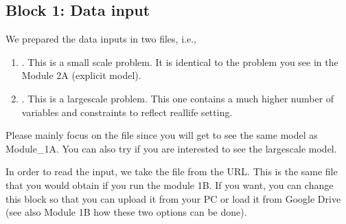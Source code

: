 \documentclass[letterpaper,10pt,english]{jupyterBook}
\begin{document}
\subsection{Block 1: Data input}
\label{\detokenize{docs/Case1_5_Module2B_Retail_Price_Optimization_Script:block-1-data-input}}
\sphinxAtStartPar
We prepared the data inputs in two files, i.e.,
\begin{enumerate}
%
\item {} 
\sphinxAtStartPar
{}. This is a small scale problem. It is identical to the problem you see in the Module 2A (explicit model).

\item {} 
\sphinxAtStartPar
{}. This is a large\sphinxhyphen{}scale problem. This one contains a much higher number of variables and constraints to reflect real\sphinxhyphen{}life setting.

\end{enumerate}

\sphinxAtStartPar
Please mainly focus on the file  since you will get to see the same model as Module\_1A. You can also try  if you are interested to see the large\sphinxhyphen{}scale model.

\sphinxAtStartPar
In order to read the input, we take the file from the URL. This is the same file that you would obtain if you run the module 1B. If you want, you can change this block so that you can upload it from your PC or load it from Google Drive (see also Module 1B how these two options can be done).
\end{document}
